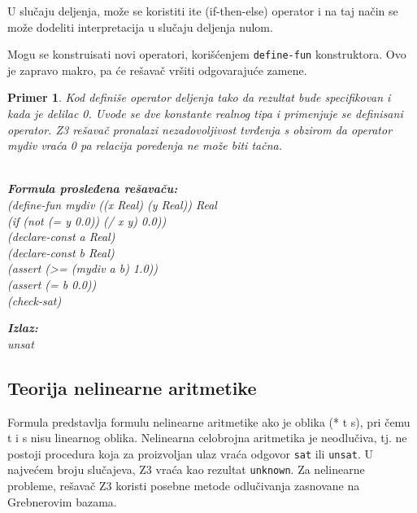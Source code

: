 \documentclass[12pt,oneside]{memoir}
\newcommand\tab[1][0.5cm]{\hspace*{#1}}
\newtheorem{primer}{Primer}
\begin{document}
U slučaju deljenja, može se koristiti ite (if-then-else) operator i na taj način se može dodeliti interpretacija u slučaju deljenja nulom.
\par
Mogu se konstruisati novi operatori, korišćenjem \texttt{define-fun} konstruktora. Ovo je zapravo makro, pa će rešavač vršiti odgovarajuće zamene.
\begin{primer} Kod definiše operator deljenja tako da rezultat bude specifikovan i kada je delilac 0. Uvode se dve konstante realnog tipa i primenjuje se definisani operator. Z3 rešavač pronalazi nezadovoljivost tvrđenja s obzirom da operator mydiv vraća 0 pa relacija poređenja ne može biti tačna.\\ \\
\begin{minipage}[b]{0.5\textwidth}
\textbf{Formula prosleđena rešavaču:}
\\(define-fun mydiv ((x Real) (y Real)) Real
\\\tab (if (not (= y 0.0))  (/ x y)  0.0))
\\(declare-const a Real)
\\(declare-const b Real)
\\(assert (>= (mydiv a b) 1.0))
\\(assert (= b 0.0))
\\(check-sat)
\end{minipage}
\hspace{3cm}
\begin{minipage}[t]{0.4\textwidth}
\vspace{-4.73cm}
\textbf{Izlaz:}
\\unsat
\end{minipage}
\end{primer}
\subsection{Teorija nelinearne aritmetike} 

Formula predstavlja formulu nelinearne aritmetike ako je oblika (* t s), pri čemu t i s nisu linearnog oblika.
Nelinearna celobrojna aritmetika je neodlučiva, tj. ne postoji procedura koja za proizvoljan ulaz vraća odgovor \texttt{sat} ili \texttt{unsat}. U najvećem broju slučajeva, Z3 vraća kao rezultat \texttt{unknown}. Za nelinearne probleme, rešavač Z3 koristi posebne metode odlučivanja zasnovane na Grebnerovim bazama. 
\end{document}

